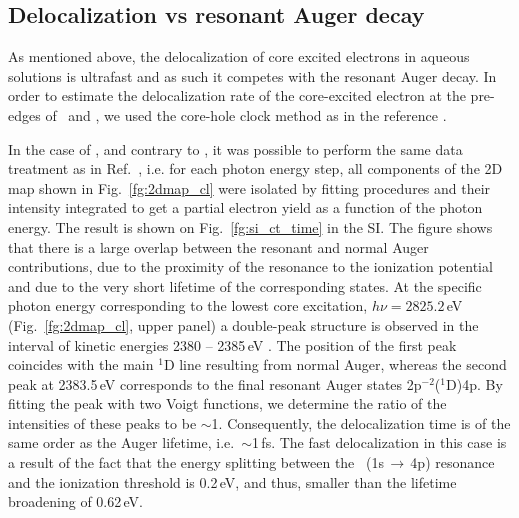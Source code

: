 
\subsection{Delocalization vs resonant Auger decay}

As mentioned above, the delocalization of core excited electrons in aqueous solutions is ultrafast and as such it competes with the resonant Auger decay. In order to estimate the delocalization rate of the core-excited electron at the pre-edges of \ki~and \cli, we used the core-hole clock method as in the reference  \cite{bjorneholm92:1892,karis96:1380}.

In the case of \cli, and contrary to \ki, it was possible to perform the same data treatment as in Ref.\ \cite{ceolin15:022502}, %
i.e. for each photon energy step, all components of the 2D map shown in Fig.\ \ref{fg:2dmap_cl} were isolated by fitting procedures and their intensity integrated to get a partial electron yield as a function of the photon energy. The result is shown on Fig.\ \ref{fg:si_ct_time} in the SI. The figure shows that there is a large overlap between the resonant and normal Auger contributions, due to the proximity of the resonance to the ionization potential and due to the very short lifetime of the corresponding states. 
At the specific photon energy corresponding to the lowest core excitation, $h\nu = 2825.2$\,eV (Fig.\ \ref{fg:2dmap_cl}, upper panel) a double-peak structure is observed in the interval of kinetic energies 2380 -- 2385\,eV . The position of the first peak coincides with the main $^1$D line resulting from normal Auger, whereas the second peak at 2383.5\,eV corresponds to the final resonant Auger states 2p$^{-2}$($^1$D)4p. By fitting the peak with two Voigt functions, we determine the ratio of the intensities of these peaks to be $\sim$1. Consequently, the delocalization time is of the same order as the Auger lifetime, i.e.\ $\sim$1\,fs. The fast delocalization in this case is a result of the fact that the energy splitting between the \cli~(1s$\,\rightarrow\,$4p) resonance and the ionization threshold is 0.2\,eV, and thus, smaller than the lifetime broadening of 0.62\,eV.

